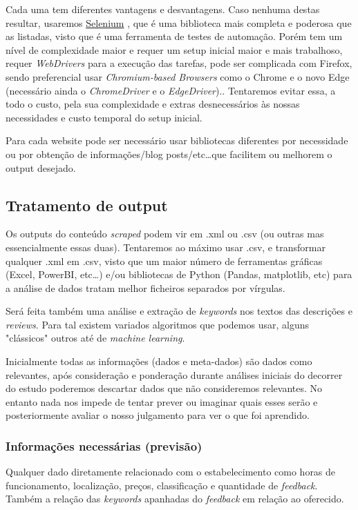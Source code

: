 \documentclass[a4paper,10pt]{article}
\begin{document}
Cada uma tem diferentes vantagens e desvantagens.
Caso nenhuma destas resultar, usaremos \href{https://pypi.org/project/selenium/}{Selenium} , que é uma biblioteca mais completa e poderosa que as listadas, visto que é uma ferramenta de testes de automação.
Porém tem um nível de complexidade maior e requer um setup inicial maior e mais trabalhoso, requer \textit{WebDrivers} para a execução das tarefas, pode ser complicada com Firefox, sendo preferencial usar \textit{Chromium-based Browsers} como o Chrome e o novo Edge (necessário ainda o \textit{ChromeDriver} e o \textit{EdgeDriver})..
Tentaremos evitar essa, a todo o custo, pela sua complexidade e extras desnecessários às nossas necessidades e custo temporal do setup inicial.

Para cada website pode ser necessário usar bibliotecas diferentes por necessidade ou por obtenção de informações/blog posts/etc\ldots que facilitem ou melhorem o output desejado.

\subsection{Tratamento de output}

Os outputs do conteúdo \textit{scraped} podem vir em .xml ou .csv (ou outras mas essencialmente essas duas).
Tentaremos ao máximo usar .csv, e transformar qualquer .xml em .csv, visto que um maior número de ferramentas gráficas (Excel, PowerBI, etc\ldots) e/ou bibliotecas de Python (Pandas, matplotlib, etc) para a análise de dados tratam melhor ficheiros separados por vírgulas.

Será feita também uma análise e extração de \textit{keywords} nos textos das descrições e \textit{reviews}.
Para tal existem variados algoritmos que podemos usar, alguns "clássicos" outros até de \textit{machine learning}.

Inicialmente todas as informações (dados e meta-dados) são dados como relevantes, após consideração e ponderação durante análises iniciais do decorrer do estudo poderemos descartar dados que não consideremos relevantes.
No entanto nada nos impede de tentar prever ou imaginar quais esses serão e posteriormente avaliar o nosso julgamento para ver o que foi aprendido.

\subsubsection{Informações necessárias (previsão)}

Qualquer dado diretamente relacionado com o estabelecimento como horas de funcionamento, localização, preços, classificação e quantidade de \textit{feedback}.
Também a relação das \textit{keywords} apanhadas do \textit{feedback} em relação ao oferecido.
\end{document}
